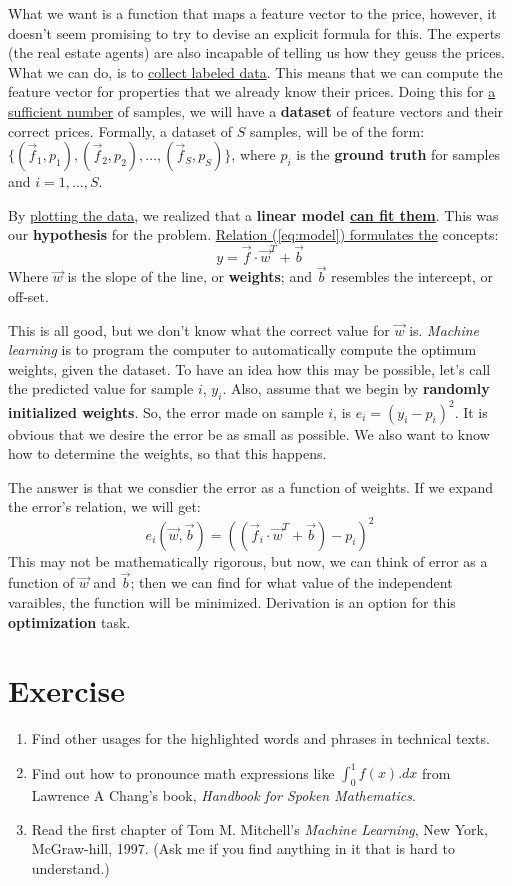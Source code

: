 \documentclass{article}
\begin{document}
What we want is a function that maps a feature vector to the price, however, it doesn't seem promising to try to devise an explicit formula for this. The experts (the real estate agents) are also incapable of telling us how they geuss the prices. What we can do, is to \underline{collect labeled data}. This means that we can compute the feature vector for properties that we already know their prices. Doing this for \underline{a sufficient number} of samples, we will have a \textbf{dataset} of feature vectors and their correct prices. Formally, a dataset of $S$ samples, will be of the form: $\{(\vec{f}_1, p_1), (\vec{f}_2, p_2), \ldots, (\vec{f}_S, p_S)\}$, where $p_i$ is the \textbf{ground truth} for samples and $i={1, \ldots, S}$. 

By \underline{plotting the data}, we realized that a \textbf{linear model \underline{can fit them}}. This was our \textbf{hypothesis} for the problem. \underline{Relation (\ref{eq:model}) formulates the} concepts:
\begin{equation}
y = \vec{f}\cdot \vec{w}^T + \vec{b}
\label{eq:model}
\end{equation}
Where $\vec{w}$ is the slope of the line, or \textbf{weights}; and $\vec{b}$ resembles the intercept, or off-set. 

This is all good, but we don't know what the correct value for $\vec{w}$ is. \emph{Machine learning} is to program the computer to automatically compute the optimum weights, given the dataset. To have an idea how this may be possible, let's call the predicted value for sample $i$, $y_i$. Also, assume that we begin by \textbf{randomly initialized weights}. So, the error made on sample $i$, is $e_i = (y_i - p_i)^2$. It is obvious that we desire the error be as small as possible. We also want to know how to determine the weights, so that this happens.

The answer is that we consdier the error as a function of weights. If we expand the error's relation, we will get:
\begin{equation}
e_i(\vec{w}, \vec{b}) = ((\vec{f}_i\cdot \vec{w}^T +\vec{b})-p_i)^2
\label{eq:error}
\end{equation}
This may not be mathematically rigorous, but now, we can think of error as a function of $\vec{w}$ and $\vec{b}$; then we can find for what value of the independent varaibles, the function will be minimized. Derivation is an option for this \textbf{optimization} task.
\section{Exercise}
\begin{enumerate}
\item Find other usages for the highlighted words and phrases in technical texts.
\item Find out how to pronounce math expressions like $\int_0^1 f(x).dx$ from Lawrence A Chang's book, \emph{Handbook for Spoken Mathematics}.
\item Read the first chapter of Tom M. Mitchell's \emph{Machine Learning}, New York, McGraw-hill, 1997. (Ask me if you find anything in it that is hard to understand.)
\end{enumerate}
\end{document}
